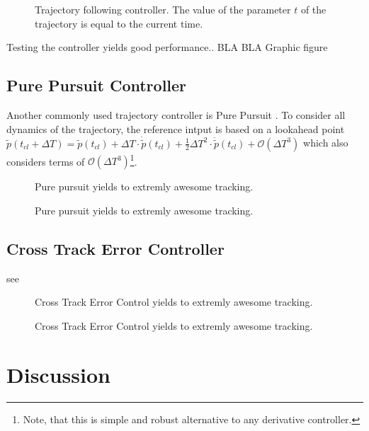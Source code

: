 \begin{figure}[h]
    \centering
    \def\svgwidth{\columnwidth}
    
    \caption{Trajectory following controller. The value of the parameter $t$ of the trajectory is equal to the current time.}
    \label{fig:trajectoryfollowing}
\end{figure}


Testing the controller yields good performance.. BLA BLA Graphic figure 



\subsection{Pure Pursuit Controller}
Another commonly used trajectory controller is Pure Pursuit \cite{snider}. To consider all dynamics of the trajectory, the reference intput is based on a lookahead point $\tilde{p}(t_{cl}+\Delta T) = \tilde{p}(t_{cl}) + \Delta T \cdot \dot{\tilde{p}}(t_{cl}) + \frac{1}{2} \Delta T^2 \cdot \ddot{\tilde{p}}(t_{cl}) + \mathcal{O}(\Delta T^3)$ which also considers terms of $\mathcal{O}(\Delta T^3)$\footnote{Note, that this is simple and robust alternative to any derivative controller.}.

\begin{figure}[h]
    \centering
    \def\svgwidth{0.5\columnwidth}
    
    \caption{Pure pursuit yields to extremly awesome tracking.}
    \label{fig:scene_purePursuit}
\end{figure}

\begin{figure}[h]
    \centering
    \def\svgwidth{\columnwidth}
    
    \caption{Pure pursuit yields to extremly awesome tracking.}
    \label{fig:purePursuit}
\end{figure}

\subsection{Cross Track Error Controller}
see \cite{williams}

\begin{figure}[h]
    \centering
    \def\svgwidth{0.5\columnwidth}
    
    \caption{Cross Track Error Control yields to extremly awesome tracking.}
    \label{fig:scene_crossTrack}
\end{figure}


\begin{figure}[h]
    \centering
    \def\svgwidth{\columnwidth}
    
    \caption{Cross Track Error Control yields to extremly awesome tracking.}
    \label{fig:crossTrack}
\end{figure}

\section{Discussion}
\label{sec:discussion}

